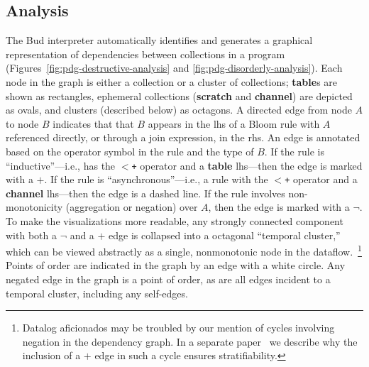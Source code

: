 \subsection{Analysis}

The Bud interpreter automatically identifies and generates a graphical
representation of dependencies between collections in a program
(Figures~\ref{fig:pdg-destructive-analysis} and \ref{fig:pdg-disorderly-analysis}).
Each node in the graph is either a collection or a cluster of collections; \textbf{table}s are shown as rectangles, ephemeral
collections (\textbf{scratch} and \textbf{channel}) are depicted as ovals, and clusters (described below) as octagons.  A
directed edge from node $A$ to node $B$ indicates that that $B$ appears in the
lhs of a Bloom rule with $A$ referenced directly, or through a join expression,
in the rhs.  An edge is annotated based on the operator symbol in the rule and
the type of $B$.  If the rule is ``inductive''---i.e., has the \texttt{$<$+}
operator and a {\bf table} lhs---then the edge is marked with a $+$.  If the
rule is ``asynchronous''---i.e., a rule with the \texttt{$<$+} operator and a {\bf
channel} lhs---then the edge is a dashed line.  If the rule involves
non-monotonicity (aggregation or negation) over $A$, then the edge is marked with a $\lnot$.
To make the visualizations more readable, any strongly connected component with both a $\lnot$ and a $+$ edge is collapsed into a octagonal ``temporal cluster,'' 
which can be viewed abstractly as a single, nonmonotonic node in the 
dataflow.~\footnote{Datalog aficionados may be troubled by our mention of cycles
involving negation in the dependency graph.  In a separate paper~\cite{dedalus-techr} we
describe why the inclusion of a $+$ edge in such a cycle ensures stratifiability.}
Points of order are indicated in the graph by an edge with a white circle.
 Any negated edge in the graph is a point of order, as are all edges incident to a temporal cluster, including any self-edges.


